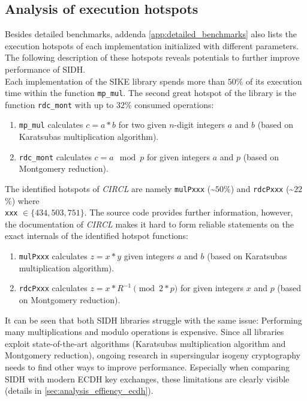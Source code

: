 \subsection{Analysis of execution hotspots}\label{sec:analysis_sidh_hotspots}
Besides detailed benchmarks, addenda \ref{app:detailed_benchmarks} also lists the execution hotspots of each implementation initialized with different parameters. The following description of these hotspots reveals potentials to further improve performance of \gls{SIDH}.\\
Each implementation of the \gls{SIKE} library spends more than $50$\% of its execution time within the function \texttt{mp\_mul}. The second great hotspot of the library is the function \texttt{rdc\_mont} with up to $32$\% consumed operations:
\begin{enumerate}
\item \texttt{mp\_mul} calculates $c=a*b$ for two given $n$-digit integers $a$ and $b$ (based on Karatsubas multiplication algorithm).
\item \texttt{rdc\_mont} calculates $c = a\mod p$ for given integers $a$ and $p$ (based on Montgomery reduction).
\end{enumerate}
The identified hotspots of \textit{\gls{CIRCL}} are namely \texttt{mulPxxx} (\textasciitilde $50$\%) and \texttt{rdcPxxx} (\textasciitilde $22$\%) where \\\texttt{xxx} $\in \{434, 503, 751\}$. The source code provides further information, however, the documentation of \textit{\gls{CIRCL}} makes it hard to form reliable statements on the exact internals of the identified hotspot functions:
\begin{enumerate}
\item \texttt{mulPxxx} calculates $z=x*y$ given integers $a$ and $b$ (based on Karatsubas multiplication algorithm).
\item \texttt{rdcPxxx} calculates $z = x*R^{-1} \pmod{2*p}$ for given integers $x$ and $p$ (based on Montgomery reduction).
\end{enumerate}
It can be seen that both \gls{SIDH} libraries struggle with the same issue: Performing many multiplications and modulo operations is expensive. Since all libraries exploit state-of-the-art algorithms (Karatsubas multiplication algorithm and Montgomery reduction), ongoing research in supersingular isogeny cryptography needs to find other ways to improve performance. Especially when comparing \gls{SIDH} with modern \gls{ECDH} key exchanges, these limitations are clearly visible (details in \autoref{sec:analysis_effiency_ecdh}).

